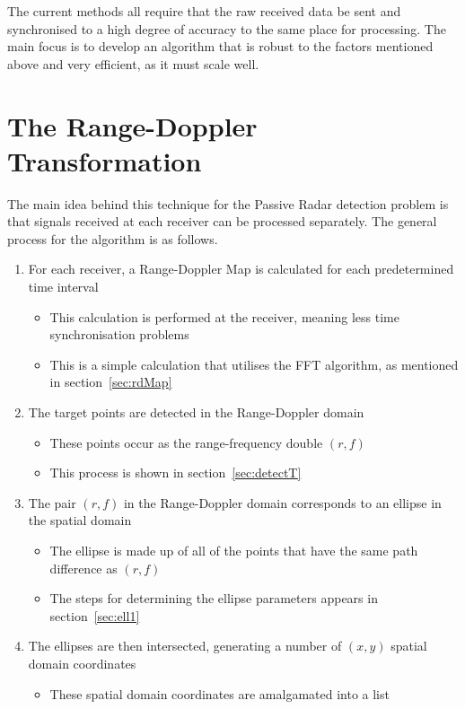 \documentclass[12pt,openany,a4paper]{book}
\begin{document}
The current methods all require that the raw received data be sent and synchronised to a high degree of accuracy to the same place for processing. The main focus is to develop an algorithm that is robust to the factors mentioned above and very efficient, as it must scale well.


\section{The Range-Doppler Transformation}
The main idea behind this technique for the Passive Radar detection problem is that signals received at each receiver can be processed separately. The general process for the algorithm is as follows.

\begin{enumerate}
	\item{For each receiver, a Range-Doppler Map is calculated for each predetermined time interval}
	\begin{itemize}
		\item{This calculation is performed at the receiver, meaning less time synchronisation problems}
		\item{This is a simple calculation that utilises the FFT algorithm, as mentioned in section~\ref{sec:rdMap}}
	\end{itemize}
	\item{The target points are detected in the Range-Doppler domain}
		\begin{itemize}
		\item{These points occur as the range-frequency double $(r,f)$}
		\item{This process is shown in section~\ref{sec:detectT}}
	\end{itemize}
	\item{The pair $(r,f)$ in the Range-Doppler domain corresponds to an ellipse in the spatial domain}
	\begin{itemize}
		\item{The ellipse is made up of all of the points that have the same path difference as $(r,f)$}
		\item{The steps for determining the ellipse parameters appears in section~\ref{sec:ell1}}
	\end{itemize}
	\item{The ellipses are then intersected, generating a number of $(x,y)$ spatial domain coordinates}
	\begin{itemize}
		\item{These spatial domain coordinates are amalgamated into a list}

\end{itemize}
\end{enumerate}
\end{document}
